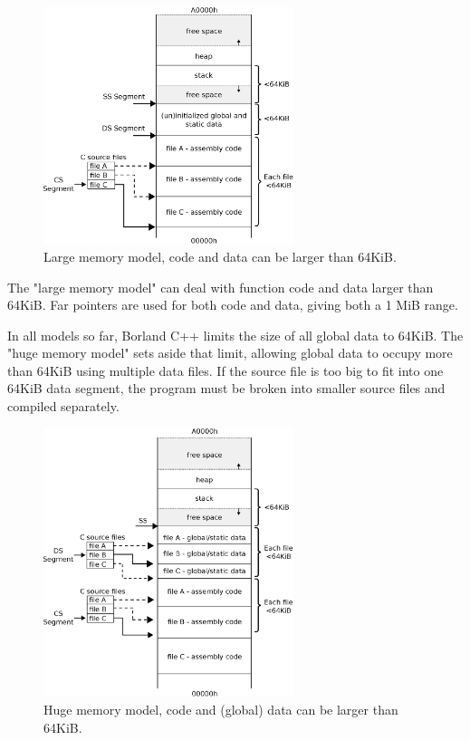 \documentclass[book.tex]{subfiles}
\begin{document}
\begin{figure}[H]
\centering
\includegraphics[width=0.65\textwidth]{imgs/drawings/memory/large_mm.eps}
\caption{Large memory model, code and data can be larger than 64KiB.}
\label{fig:mm_large}
\end{figure}



\par
The "large memory model" can deal with function code and data larger than 64KiB. Far pointers are used for both code and data, giving both a 1 MiB range.\\

\par
In all models so far, Borland C++ limits the size of all global data to 64KiB. The "huge memory model" sets aside that limit, allowing global data to occupy more than 64KiB using multiple data files. If the source file is too big to fit into one 64KiB data segment, the program must be broken into smaller source files and compiled separately.\\
\begin{figure}[H]
\centering
\includegraphics[width=0.65\textwidth]{imgs/drawings/memory/huge_mm.eps}
\caption{Huge memory model, code and (global) data can be larger than 64KiB.}
\label{fig:mm_large}
\end{figure}
\end{document}
